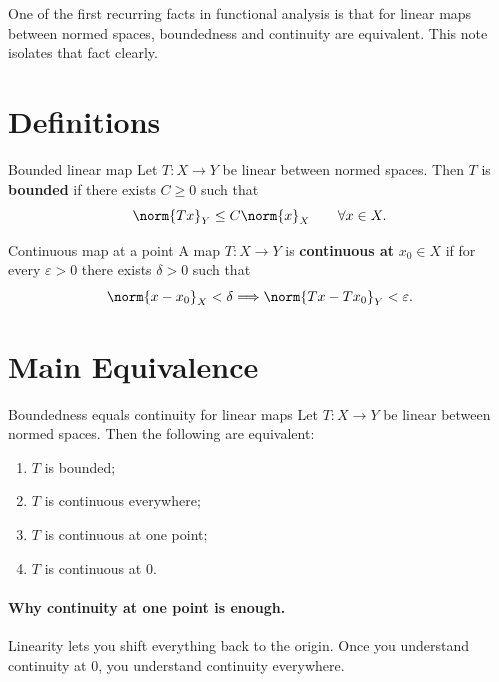 \documentclass[header={Ancillary Note: Bounded vs Continuous},notheorems]{study-note}
\begin{document}

\vspace{0.8em}

\begin{focusbox}
One of the first recurring facts in functional analysis is that for linear maps between normed spaces, boundedness and continuity are equivalent. This note isolates that fact clearly.
\end{focusbox}

\tableofcontents

\section{Definitions}

\begin{defbox}{Bounded linear map}
Let $T:X\to Y$ be linear between normed spaces. Then $T$ is \textbf{bounded} if there exists $C\ge 0$ such that
\[
\norm{Tx}_Y\le C\norm{x}_X
\qquad \forall x\in X.
\]
\end{defbox}

\begin{defbox}{Continuous map at a point}
A map $T:X\to Y$ is \textbf{continuous at} $x_0\in X$ if for every $\varepsilon>0$ there exists $\delta>0$ such that
\[
\norm{x-x_0}_X<\delta
\Longrightarrow
\norm{Tx-Tx_0}_Y<\varepsilon.
\]
\end{defbox}

\section{Main Equivalence}

\begin{thmbox}{Boundedness equals continuity for linear maps}
Let $T:X\to Y$ be linear between normed spaces. Then the following are equivalent:
\begin{enumerate}
\item $T$ is bounded;
\item $T$ is continuous everywhere;
\item $T$ is continuous at one point;
\item $T$ is continuous at $0$.
\end{enumerate}
\end{thmbox}

\paragraph{Why continuity at one point is enough.}
Linearity lets you shift everything back to the origin. Once you understand continuity at $0$, you understand continuity everywhere.
\end{document}
